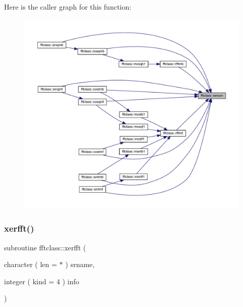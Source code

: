 Here is the caller graph for this function\+:\nopagebreak
\begin{figure}[H]
\begin{center}
\leavevmode
\includegraphics[width=350pt]{namespacefftclass_a16b89da06cf17773f6b5aec6883952c2_icgraph}
\end{center}
\end{figure}
\mbox{\label{namespacefftclass_a3e1884f0fa20142f45f2d3efe3246adc}} 
\subsubsection{\texorpdfstring{xerfft()}{xerfft()}}
{\footnotesize\ttfamily subroutine fftclass\+::xerfft (\begin{DoxyParamCaption}\item[{character ( len = $\ast$ )}]{srname,  }\item[{integer ( kind = 4 )}]{info }\end{DoxyParamCaption})}

